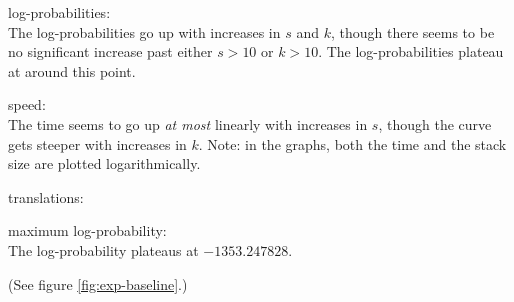 \documentclass[answers]{exam}
\begin{document}
\begin{questions}
\begin{framed}
\begin{compactenum}[a.]
\item log-probabilities:\\
  The log-probabilities go up with increases in $s$ and $k$, though there seems
  to be no significant increase past either $s > 10$ or $k > 10$. The
  log-probabilities plateau at around this point. 
\item speed:\\
  The time seems to go up \emph{at most} linearly with increases in $s$, though
  the curve gets steeper with increases in $k$. Note: in the graphs, both the
  time and the stack size are plotted logarithmically.
\item translations:
\item maximum log-probability:\\
  The log-probability plateaus at $-1353.247828$.
\end{compactenum}
(See figure \ref{fig:exp-baseline}.)
\end{framed}



\end{questions}
\end{document}
